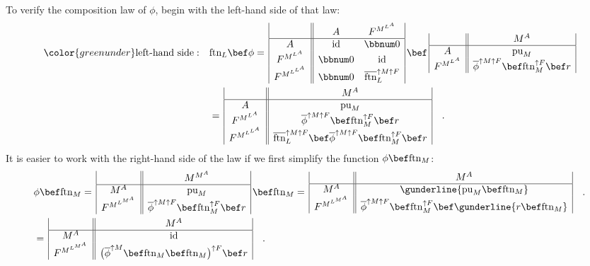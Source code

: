 To verify the composition law of $\phi$, begin with the left-hand
side of that law:
\begin{align*}
{\color{greenunder}\text{left-hand side}:}\quad & \text{ftn}_{L}\bef\phi=\,\begin{array}{|c||cc|}
 & A & F^{M^{L^{A}}}\\
\hline A & \text{id} & \bbnum 0\\
F^{M^{L^{A}}} & \bbnum 0 & \text{id}\\
F^{M^{L^{L^{A}}}} & \bbnum 0 & \overline{\text{ftn}}_{L}^{\uparrow M\uparrow F}
\end{array}\,\bef\,\begin{array}{|c||c|}
 & M^{A}\\
\hline A & \text{pu}_{M}\\
F^{M^{L^{A}}} & \overline{\phi}^{\uparrow M\uparrow F}\bef\text{ftn}_{M}^{\uparrow F}\bef r
\end{array}\\
 & =\,\begin{array}{|c||c|}
 & M^{A}\\
\hline A & \text{pu}_{M}\\
F^{M^{L^{A}}} & \overline{\phi}^{\uparrow M\uparrow F}\bef\text{ftn}_{M}^{\uparrow F}\bef r\\
F^{M^{L^{L^{A}}}} & \overline{\text{ftn}}_{L}^{\uparrow M\uparrow F}\bef\overline{\phi}^{\uparrow M\uparrow F}\bef\text{ftn}_{M}^{\uparrow F}\bef r
\end{array}\quad.
\end{align*}
It is easier to work with the right-hand side of the law if we first
simplify the function $\phi\bef\text{ftn}_{M}$: 
\begin{align*}
 & \phi\bef\text{ftn}_{M}=\,\begin{array}{|c||c|}
 & M^{M^{A}}\\
\hline M^{A} & \text{pu}_{M}\\
F^{M^{L^{M^{A}}}} & \overline{\phi}^{\uparrow M\uparrow F}\bef\text{ftn}_{M}^{\uparrow F}\bef r
\end{array}\,\bef\text{ftn}_{M}=\,\begin{array}{|c||c|}
 & M^{A}\\
\hline M^{A} & \gunderline{\text{pu}_{M}\bef\text{ftn}_{M}}\\
F^{M^{L^{M^{A}}}} & \overline{\phi}^{\uparrow M\uparrow F}\bef\text{ftn}_{M}^{\uparrow F}\bef\gunderline{r\bef\text{ftn}_{M}}
\end{array}\quad.\\
 & =\,\begin{array}{|c||c|}
 & M^{A}\\
\hline M^{A} & \text{id}\\
F^{M^{L^{M^{A}}}} & \big(\overline{\phi}^{\uparrow M}\bef\text{ftn}_{M}\bef\text{ftn}_{M}\big)^{\uparrow F}\bef r
\end{array}\quad.
\end{align*}
